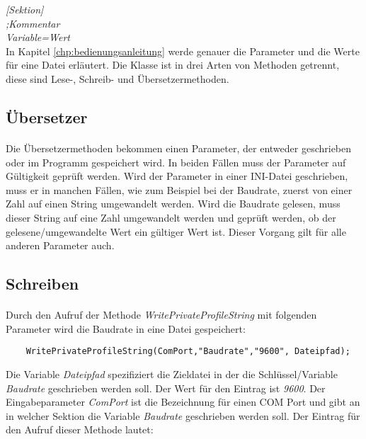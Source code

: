\hspace*{20mm}\textit{[Sektion]}    \\
\hspace*{20mm}\textit{;Kommentar}    \\
\hspace*{20mm}\textit{Variable=Wert}\\

In Kapitel \ref{chp:bedienungsanleitung} werde genauer die Parameter und die Werte für eine Datei erläutert. Die Klasse ist in drei Arten von Methoden getrennt, diese sind Lese-, Schreib- und Übersetzermethoden.\\

\subsection{Übersetzer}
\paragraph{}
Die Übersetzermethoden bekommen einen Parameter, der entweder geschrieben oder im Programm gespeichert wird. In beiden Fällen muss der Parameter auf Gültigkeit geprüft werden. Wird der Parameter in einer INI-Datei geschrieben, muss er in manchen Fällen, wie zum Beispiel bei der Baudrate, zuerst von einer Zahl auf einen String umgewandelt werden. Wird die Baudrate gelesen, muss dieser String auf eine Zahl umgewandelt werden und geprüft werden, ob der gelesene/umgewandelte Wert ein gültiger Wert ist. Dieser Vorgang gilt für alle anderen Parameter auch.



\subsection{Schreiben}
\paragraph{}
Durch den Aufruf der Methode \textit{WritePrivateProfileString} mit folgenden Parameter wird die Baudrate in eine Datei gespeichert:\\

\begin{lstlisting}
	WritePrivateProfileString(ComPort,"Baudrate","9600", Dateipfad);
\end{lstlisting}

Die Variable \textit{Dateipfad} spezifiziert die Zieldatei in der die Schlüssel/Variable \textit{Baudrate} geschrieben werden soll. Der Wert für den Eintrag ist \textit{9600}. Der Eingabeparameter \textit{ComPort} ist die Bezeichnung für einen COM Port und gibt an in welcher Sektion die Variable \textit{Baudrate} geschrieben werden soll. Der Eintrag für den Aufruf dieser Methode lautet:\\

